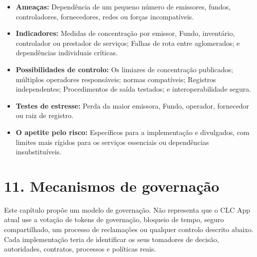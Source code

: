 \documentclass[11pt]{article}
\begin{document}
\begin{itemize}[leftmargin=*]
\item \textbf{Ameaças:} Dependência de um pequeno número de emissores, fundos, controladores, fornecedores, redes ou forças incompatíveis.
\item \textbf{Indicadores:} Medidas de concentração por emissor, Fundo, inventário, controlador ou prestador de serviços; Falhas de rota entre aglomerados; e dependências individuais críticas.
\item \textbf{Possibilidades de controlo:} Os limiares de concentração publicados; múltiplos operadores responsáveis; normas compatíveis; Registros independentes; Procedimentos de saída testados; e interoperabilidade segura.
\item \textbf{Testes de estresse:} Perda da maior emissora, Fundo, operador, fornecedor ou raiz de registro.
\item \textbf{O apetite pelo risco:} Específicos para a implementação e divulgados, com limites mais rígidos para os serviços essenciais ou dependências insubstituíveis.
\end{itemize}

\section*{11. Mecanismos de governação}

Este capítulo propõe um modelo de governação. Não representa que o CLC App atual use a votação de tokens de governação, bloqueio de tempo, seguro compartilhado, um processo de reclamações ou qualquer controlo descrito abaixo. Cada implementação teria de identificar os seus tomadores de decisão, autoridades, contratos, processos e políticas reais.
\end{document}
